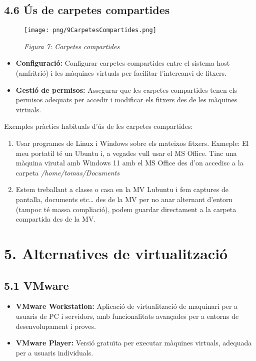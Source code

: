 \documentclass[
  12 pt,
  a4paper,
]{article}
\providecommand{\tightlist}{%
  \setlength{\itemsep}{0pt}\setlength{\parskip}{0pt}}
\begin{document}
\subsection{4.6 Ús de carpetes
compartides}\label{uxfas-de-carpetes-compartides}

\begin{figure}
\centering
\texttt{[image: png/9CarpetesCompartides.png]}
\caption{\emph{Figura 7: Carpetes compartides}}
\end{figure}

\begin{itemize}
\tightlist
\item
  \textbf{Configuració:} Configurar carpetes compartides entre el
  sistema host (amfritrió) i les màquines virtuals per facilitar
  l'intercanvi de fitxers.
\item
  \textbf{Gestió de permisos:} Assegurar que les carpetes compartides
  tenen els permisos adequats per accedir i modificar els fitxers des de
  les màquines virtuals.
\end{itemize}

Exemples pràctics habituals d'ús de les carpetes compartides:

\begin{enumerate}
\def\labelenumi{\arabic{enumi}.}
\item
  Usar programes de Linux i Windows sobre els mateixos fitxers. Exmeple:
  El meu portatil té un Ubuntu i, a vegades vull usar el MS Office. Tinc
  una màquina virutal amb Windows 11 amb el MS Office des d'on accedisc
  a la carpeta \emph{/home/tomas/Documents}
\item
  Estem treballant a classe o casa en la MV Lubuntu i fem captures de
  pantalla, documents etc\ldots{} des de la MV per no anar alternant
  d'entorn (tampoc té massa compliació), podem guardar directament a la
  carpeta compartida des de la MV.
\end{enumerate}

\section{5. Alternatives de
virtualització}\label{alternatives-de-virtualitzaciuxf3}

\subsection{5.1 VMware}\label{vmware}

\begin{itemize}
\tightlist
\item
  \textbf{VMware Workstation:} Aplicació de virtualització de maquinari
  per a usuaris de PC i servidors, amb funcionalitats avançades per a
  entorns de desenvolupament i proves.
\item
  \textbf{VMware Player:} Versió gratuïta per executar màquines
  virtuals, adequada per a usuaris individuals.
\end{itemize}
\end{document}
